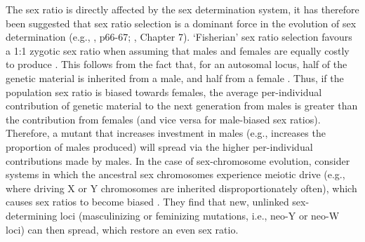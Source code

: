 \documentclass[12pt]{article}
\begin{document}
The sex ratio is directly affected by the sex determination system, it has therefore been suggested that sex ratio selection is a dominant force in the evolution of sex determination (e.g., \citealt{Bull:1983vi}, p66-67; \citealt{Beukeboom:2014vb}, Chapter 7). 
`Fisherian' sex ratio selection favours a 1:1 zygotic sex ratio when assuming that males and females are equally costly to produce \citep{Fisher:1930wy,Charnov:1982wg}.
This follows from the fact that, for an autosomal locus, half of the genetic material is inherited from a male, and half from a female \citep{West:2009we}. 
Thus, if the population sex ratio is biased towards females, the average per-individual contribution of genetic material to the next generation from males is greater than the contribution from females (and vice versa for male-biased sex ratios). 
Therefore, a mutant that increases investment in males (e.g., increases the proportion of males produced) will spread via the higher per-individual contributions made by males. 
In the case of sex-chromosome evolution, \citet{Kozielska:2010vm} consider systems in which the ancestral sex chromosomes experience meiotic drive (e.g., where driving X or Y chromosomes are inherited disproportionately often), which causes sex ratios to become biased \citep{Hamilton:1967ts}. 
They find that new, unlinked sex-determining loci (masculinizing or feminizing mutations, i.e., neo-Y or neo-W loci) can then spread, which restore an even sex ratio. 
\end{document}
